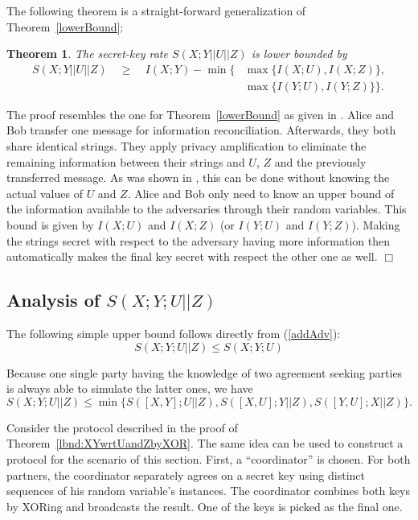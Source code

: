 \documentclass[a4paper, twoside, openany]{report}
\theoremstyle{plain}
\newtheorem{theorem}{Theorem}
\theoremstyle{definition}
\newcommand{\proofend}{\hspace*{\fill} $\Box$\\}
\begin{document}
\newpage

\noindent
The following theorem is a straight-forward generalization of Theorem~\ref{lowerBound}:
\begin{theorem} \label{lbnd:XYwrtUandZ}
The secret-key rate $S(X;Y||U||Z)$ is lower bounded by
\begin{eqnarray*}
S(X;Y||U||Z) \quad \geq & \ I(X;Y) - \min\{\!\!\!\!\! & \max\{I(X;U), I(X;Z)\}, \\
                        &                             & \max\{I(Y;U), I(Y;Z)\}\}.
\end{eqnarray*}
\end{theorem}

\proof
The proof resembles the one for Theorem~\ref{lowerBound} as given in \cite{diss}. Alice and Bob transfer one message for information reconciliation. Afterwards, they both share identical strings. They apply privacy amplification to eliminate the remaining information between their strings and $U$, $Z$ and the previously transferred message. As was shown in \cite{diss}, this can be done without knowing the actual values of $U$ and $Z$. Alice and Bob only need to know an upper bound of the information available to the adversaries through their random variables. This bound is given by $I(X;U)$ and $I(X;Z)$ (or $I(Y;U)$ and $I(Y;Z)$). Making the strings secret with respect to the adversary having more information then automatically makes the final key secret with respect the other one as well.
\proofend


\subsection{Analysis of $S(X;Y;U||Z)$}

The following simple upper bound follows directly from (\ref{addAdv}):
\[S(X;Y;U||Z) \leq S(X;Y;U)\]

\noindent
Because one single party having the knowledge of two agreement seeking parties is always able to simulate the latter ones, we have
\begin{equation} \label{ubdn:XYUwrtZtrivial}
S(X;Y;U||Z) \leq \min\{S([X,Y];U||Z), S([X,U];Y||Z), S([Y,U];X||Z)\}.
\end{equation}

Consider the protocol described in the proof of Theorem~\ref{lbnd:XYwrtUandZbyXOR}. The same idea can be used to construct a protocol for the scenario of this section. First, a ``coordinator'' is chosen. For both partners, the coordinator separately agrees on a secret key using distinct sequences of his random variable's instances. The coordinator combines both keys by XORing and broadcasts the result. One of the keys is picked as the final one.
\end{document}
